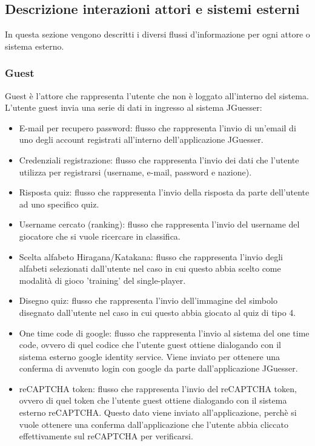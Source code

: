 \subsection{Descrizione interazioni attori e sistemi esterni}
In questa sezione vengono descritti i diversi flussi d'informazione per ogni attore o sistema esterno.

\subsubsection{Guest}
Guest è l'attore che rappresenta l'utente che non è loggato all'interno del sistema. L'utente guest invia una serie di dati in ingresso al sistema JGuesser:
\begin{itemize}
    \item E-mail per recupero password: flusso che rappresenta l'invio di un'email di uno degli account registrati all'interno dell'applicazione JGuesser.
    \item Credenziali registrazione: flusso che rappresenta l'invio dei dati che l'utente utilizza per registrarsi (username, e-mail, password e nazione).
    \item Risposta quiz: flusso che rappresenta l'invio della risposta da parte dell'utente ad uno specifico quiz.
    \item Username cercato (ranking): flusso che rappresenta l'invio del username del giocatore che si vuole ricercare in classifica.
    \item Scelta alfabeto Hiragana/Katakana: flusso che rappresenta l'invio degli alfabeti selezionati dall'utente nel caso in cui questo abbia scelto come modalità di gioco 'training' del single-player.
    \item Disegno quiz: flusso che rappresenta l'invio dell'immagine del simbolo disegnato dall'utente nel caso in cui questo abbia giocato al quiz di tipo 4.
    \item One time code di google: flusso che rappresenta l'invio al sistema del one time code, ovvero di quel codice che l'utente guest ottiene dialogando con il sistema esterno google identity service. Viene inviato per ottenere una conferma di avvenuto login con google da parte dall'applicazione JGuesser.
    \item reCAPTCHA token: flusso che rappresenta l'invio del reCAPTCHA token, ovvero di quel token che l'utente guest ottiene dialogando con il sistema esterno reCAPTCHA. Questo dato viene inviato all'applicazione, perchè si vuole ottenere una conferma dall'applicazione che l'utente abbia cliccato effettivamente sul reCAPTCHA per verificarsi.
\end{itemize}
